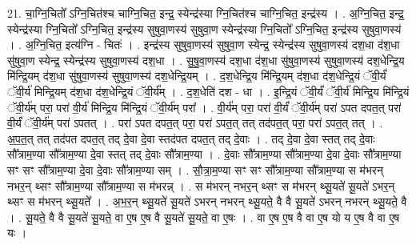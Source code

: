 \documentclass[17pt]{extarticle}
\begin{document}
21. चा॒ग्नि॒चितो᳚ ऽग्नि॒चित॑श्च चाग्नि॒चित॒ इन्द्र॒ स्येन्द्र॑स्या ग्नि॒चित॑श्च चाग्नि॒चित॒ इन्द्र॑स्य । . अ॒ग्नि॒चित॒ इन्द्र॒ स्येन्द्र॑स्या ग्नि॒चितो᳚ ऽग्नि॒चित॒ इन्द्र॑स्य सुषुवा॒णस्य॑ सुषुवा॒ण स्येन्द्र॑स्या ग्नि॒चितो᳚ ऽग्नि॒चित॒ इन्द्र॑स्य सुषुवा॒णस्य॑ । . अ॒ग्नि॒चित॒ इत्य॑ग्नि - चितः॑ । . इन्द्र॑स्य सुषुवा॒णस्य॑ सुषुवा॒ण स्येन्द्र॒ स्येन्द्र॑स्य सुषुवा॒णस्य॑ दश॒धा द॑श॒धा सु॑षुवा॒ण
स्येन्द्र॒ स्येन्द्र॑स्य सुषुवा॒णस्य॑ दश॒धा । . सु॒षु॒वा॒णस्य॑ दश॒धा द॑श॒धा सु॑षुवा॒णस्य॑ सुषुवा॒णस्य॑ दश॒धेन्द्रि॒य मि॑न्द्रि॒यम् द॑श॒धा सु॑षुवा॒णस्य॑ सुषुवा॒णस्य॑ दश॒धेन्द्रि॒यम् । . द॒श॒धेन्द्रि॒य मि॑न्द्रि॒यम् द॑श॒धा द॑श॒धेन्द्रि॒यं ॅवी॒र्यं॑ ॅवी॒र्य॑ मिन्द्रि॒यम् द॑श॒धा द॑श॒धेन्द्रि॒यं ॅवी॒र्य᳚म् । . द॒श॒धेति॑ दश - धा । . इ॒न्द्रि॒यं ॅवी॒र्यं॑ ॅवी॒र्य॑ मिन्द्रि॒य मि॑न्द्रि॒यं ॅवी॒र्य॑म् परा॒ परा॑ वी॒र्य॑ मिन्द्रि॒य मि॑न्द्रि॒यं ॅवी॒र्य॑म् परा᳚ । . वी॒र्य॑म् परा॒ परा॑ वी॒र्यं॑ ॅवी॒र्य॑म् परा॑ ऽपत दपत॒त् परा॑ वी॒र्यं॑ ॅवी॒र्य॑म् परा॑ ऽपतत् । . परा॑ ऽपत दपत॒त् परा॒ परा॑ ऽपत॒त् तत् तद॑पत॒त् परा॒ परा॑ ऽपत॒त् तत् । . अ॒प॒त॒त् तत् तद॑पत दपत॒त् तद् दे॒वा दे॒वा स्तद॑पत दपत॒त् तद् दे॒वाः । . तद् दे॒वा दे॒वा स्तत् तद् दे॒वाः सौ᳚त्राम॒ण्या सौ᳚त्राम॒ण्या दे॒वा स्तत् तद् दे॒वाः सौ᳚त्राम॒ण्या । . दे॒वाः सौ᳚त्राम॒ण्या सौ᳚त्राम॒ण्या दे॒वा दे॒वाः सौ᳚त्राम॒ण्या सꣳ सꣳ सौ᳚त्राम॒ण्या दे॒वा दे॒वाः सौ᳚त्राम॒ण्या सम् । . सौ॒त्रा॒म॒ण्या सꣳ सꣳ सौ᳚त्राम॒ण्या सौ᳚त्राम॒ण्या स म॑भरन् नभर॒न् थ्सꣳ सौ᳚त्राम॒ण्या सौ᳚त्राम॒ण्या स म॑भरन्न् । . स म॑भरन् नभर॒न् थ्सꣳ स म॑भरन् थ्सू॒यते॑ सू॒यते॑ ऽभर॒न् थ्सꣳ स म॑भरन् थ्सू॒यते᳚ । . अ॒भ॒र॒न् थ्सू॒यते॑ सू॒यते॑ ऽभरन् नभरन् थ्सू॒यते॒ वै वै सू॒यते॑ ऽभरन् नभरन् थ्सू॒यते॒ वै । . सू॒यते॒ वै वै सू॒यते॑ सू॒यते॒ वा ए॒ष ए॒ष वै सू॒यते॑ सू॒यते॒ वा ए॒षः । . वा ए॒ष ए॒ष वै वा ए॒ष यो य ए॒ष वै वा ए॒ष यः । \newline
\end{document}
